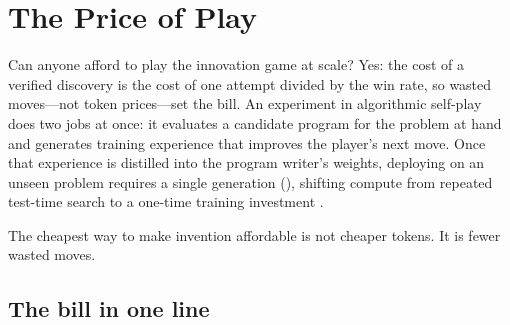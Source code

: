 \section{The Price of Play}\label{sec:price}\label{sec:economics}

Can anyone afford to play the innovation game at scale? Yes: the cost of a verified discovery is the cost of one attempt divided by the win rate, so wasted moves---not token prices---set the bill. An experiment in algorithmic self-play does two jobs at once: it evaluates a candidate program for the problem at hand and generates training experience that improves the player's next move. Once that experience is distilled into the program writer's weights, deploying \EZ{} on an unseen problem requires a single generation (\searchone{}), shifting compute from repeated test-time search to a one-time training investment \citep{amos2023amortized}.

\begin{keyidea}
The cheapest way to make invention affordable is not cheaper tokens. It is fewer wasted moves.
\end{keyidea}

\subsection{The bill in one line}\label{sub:price-bill}\label{subsec:bill-one-line}

